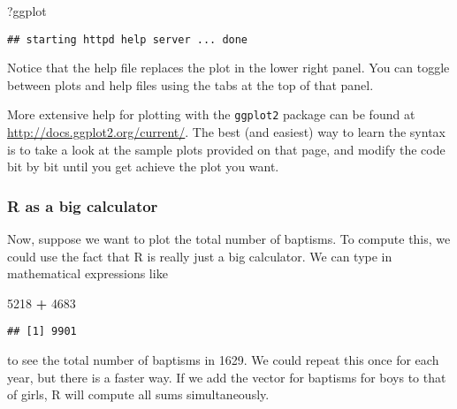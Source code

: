 \documentclass[
]{article}
\newenvironment{Shaded}{\begin{snugshade}}{\end{snugshade}}
\newcommand{\DecValTok}[1]{\textcolor[rgb]{0.00,0.00,0.81}{#1}}
\newcommand{\NormalTok}[1]{#1}
\newcommand{\SpecialCharTok}[1]{\textcolor[rgb]{0.81,0.36,0.00}{\textbf{#1}}}
\begin{document}
\begin{Shaded}
\begin{Highlighting}[]
\NormalTok{?ggplot}
\end{Highlighting}
\end{Shaded}

\begin{verbatim}
## starting httpd help server ... done
\end{verbatim}

Notice that the help file replaces the plot in the lower right panel.
You can toggle between plots and help files using the tabs at the top of
that panel.

\label{boxedtext}
More extensive help for plotting with the \texttt{ggplot2} package can
be found at \url{http://docs.ggplot2.org/current/}. The best (and
easiest) way to learn the syntax is to take a look at the sample plots
provided on that page, and modify the code bit by bit until you get
achieve the plot you want.

\subsubsection{R as a big calculator}\label{r-as-a-big-calculator}

Now, suppose we want to plot the total number of baptisms. To compute
this, we could use the fact that R is really just a big calculator. We
can type in mathematical expressions like

\begin{Shaded}
\begin{Highlighting}[]
\DecValTok{5218} \SpecialCharTok{+} \DecValTok{4683}
\end{Highlighting}
\end{Shaded}

\begin{verbatim}
## [1] 9901
\end{verbatim}

to see the total number of baptisms in 1629. We could repeat this once
for each year, but there is a faster way. If we add the vector for
baptisms for boys to that of girls, R will compute all sums
simultaneously.

\begin{Shaded}
\end{Shaded}
\end{document}
